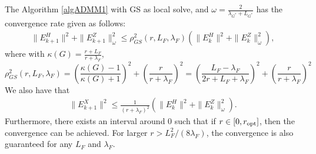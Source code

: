 
\begin{theorem}\label{thm:GS}
The Algorithm \ref{algADMM1} with GS as local solve, and $\omega = \frac{2}{\lambda_{G^*} + L_{G^*}}$ has the convergence rate given as follows: 
\begin{eqnarray}\label{gsrate}
\|E_{k+1}^H\|^2 + \|E_{k+1}^Z\|^2_{\omega} \leq \rho^2_{GS}(r,L_F,\lambda_F) \left ( \|E_{k}^H\|^2 + \|E_{k}^Z\|^2_{\omega}  \right ), 
\end{eqnarray}
where with $\kappa(G) = \frac{r+L_F}{r + \lambda_F}$, 
\begin{equation} 
\rho^2_{GS}(r,L_F,\lambda_F) =  \left ( \frac{\kappa(G) - 1}{\kappa(G) + 1} \right )^2 + \left ( \frac{r}{r+\lambda_F} \right )^2 = \left ( \frac{L_F - \lambda_F}{2r + L_F + \lambda_F} \right )^2 + \left ( \frac{r}{r+\lambda_F} \right )^2 
\end{equation} 
We also have that 
\begin{eqnarray*}
\|E_{k+1}^X\|^2 \leq \frac{1}{(r + \lambda_F)^2} \left ( \|E_k^H\|^2 + \|E_k^Z\|_\omega ^2 \right ). 
\end{eqnarray*}
Furthermore, there exists an interval around $0$ such that if $r \in [0,r_{\rm opt}]$, then the convergence can be achieved. For larger $r > L_F^2/(8\lambda_F)$, the convergence is also guaranteed for any $L_F$ and $\lambda_F$. 
\end{theorem}
